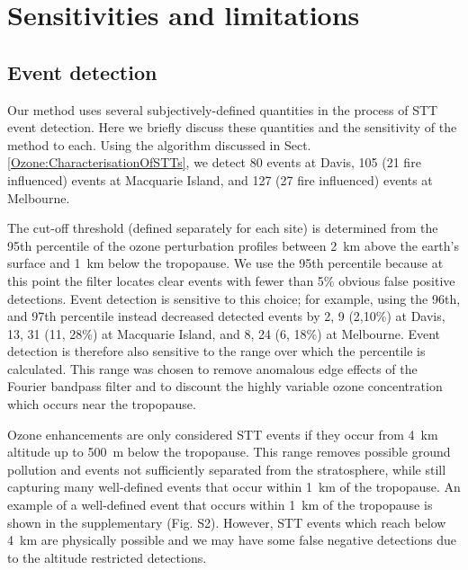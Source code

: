 \section{Sensitivities and limitations}
  \label{Ozone:sensitivity}
  \subsection{Event detection}
    Our method uses several subjectively-defined quantities in the process of STT event detection.
    Here we briefly discuss these quantities and the sensitivity of the method to each.
    Using the algorithm discussed in Sect. \ref{Ozone:CharacterisationOfSTTs}, we detect 80 events at Davis, 105 (21 fire influenced) events at Macquarie Island, and 127 (27 fire influenced) events at Melbourne.
    
    The cut-off threshold (defined separately for each site) is determined from the 95th percentile of the ozone perturbation profiles between 2~km above the earth's surface and 1~km below the tropopause.
    We use the 95th percentile because at this point the filter locates clear events with fewer than 5\% obvious false positive detections.
    Event detection is sensitive to this choice; for example, using the 96th, and 97th percentile instead decreased detected events by 2, 9 (2,10\%) at Davis, 13, 31 (11, 28\%) at Macquarie Island, and 8, 24 (6, 18\%) at Melbourne.
    Event detection is therefore also sensitive to the range over which the percentile is calculated.
    This range was chosen to remove anomalous edge effects of the Fourier bandpass filter and to discount the highly variable ozone concentration which occurs near the tropopause.
    
    Ozone enhancements are only considered STT events if they occur from 4~km altitude up to 500~m below the tropopause.
    This range removes possible ground pollution and events not sufficiently separated from the stratosphere, while still capturing many well-defined events that occur within 1~km of the tropopause.
    An example of a well-defined event that occurs within 1~km of the tropopause is shown in the supplementary (Fig. S2).
    However, STT events which reach below 4~km are physically possible and we may have some false negative detections due to the altitude restricted detections.
    
  
